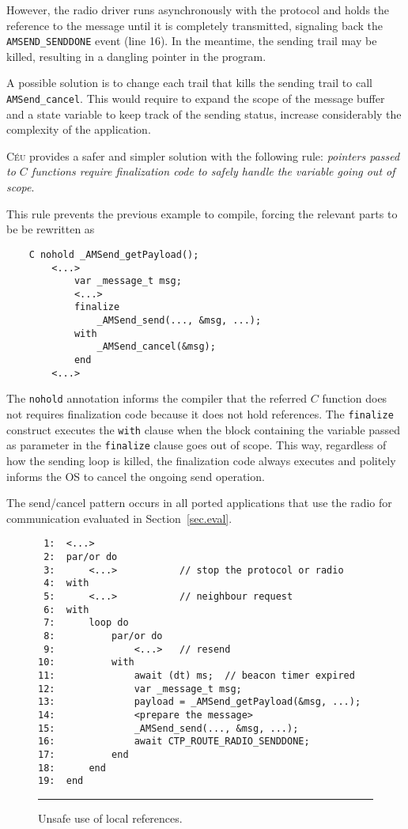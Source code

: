 \documentclass[10pt]{sensys-proc}
\newcommand{\CEU}{\textsc{C\'{e}u}\xspace}
\newcommand{\code}[1] {{\small{\texttt{#1}}}}
\begin{document}
However, the radio driver runs asynchronously with the protocol and holds the 
reference to the message until it is completely transmitted, signaling back the 
\code{AMSEND\_SENDDONE} event (line 16).
In the meantime, the sending trail may be killed, resulting in a dangling 
pointer in the program.

A possible solution is to change each trail that kills the sending trail to 
call \code{AMSend\_cancel}.
This would require to expand the scope of the message buffer and a state 
variable to keep track of the sending status, increase considerably the 
complexity of the application.

\CEU provides a safer and simpler solution with the following rule:
\emph{pointers passed to $C$ functions require finalization code to safely 
handle the variable going out of scope}.

This rule prevents the previous example to compile, forcing the relevant parts 
to be be rewritten as

{\small
\begin{verbatim}
    C nohold _AMSend_getPayload();
        <...>
            var _message_t msg;
            <...>
            finalize
                _AMSend_send(..., &msg, ...);
            with
                _AMSend_cancel(&msg);
            end
        <...>
\end{verbatim}
}

The \code{nohold} annotation informs the compiler that the referred $C$ 
function does not requires finalization code because it does not hold 
references.
The \code{finalize} construct executes the \code{with} clause when the block 
containing the variable passed as parameter in the \code{finalize} clause goes 
out of scope.
This way, regardless of how the sending loop is killed, the finalization code 
always executes and politely informs the OS to cancel the ongoing send 
operation.

The send/cancel pattern occurs in all ported applications that use the radio 
for communication evaluated in Section~\ref{sec.eval}.

\begin{figure}[t]
{\small
\begin{verbatim}
 1:  <...>
 2:  par/or do
 3:      <...>           // stop the protocol or radio
 4:  with
 5:      <...>           // neighbour request
 6:  with
 7:      loop do
 8:          par/or do
 9:              <...>   // resend
10:          with
11:              await (dt) ms;  // beacon timer expired
12:              var _message_t msg;
13:              payload = _AMSend_getPayload(&msg, ...);
14:              <prepare the message>
15:              _AMSend_send(..., &msg, ...);
16:              await CTP_ROUTE_RADIO_SENDDONE;
17:          end
18:      end
19:  end
\end{verbatim}
}
\rule{8.5cm}{0.37pt}
\caption{ Unsafe use of local references.
\label{lst.local}
}
\end{figure}
\end{document}
